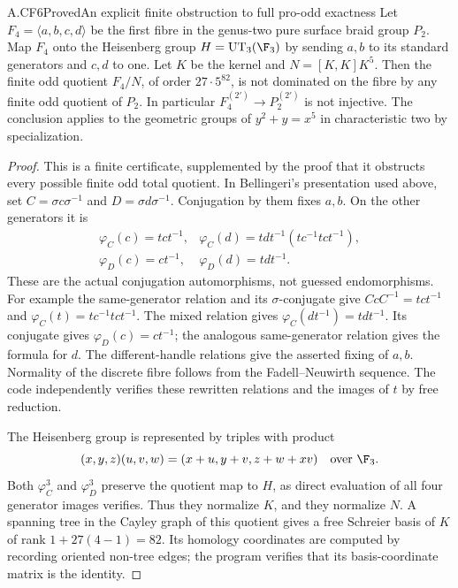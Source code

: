 \begin{claim}{A.CF6}{Proved}{An explicit finite obstruction to full pro-odd exactness}
Let $F_4=\langle a,b,c,d\rangle$ be the first fibre in the genus-two
pure surface braid group $P_2$. Map $F_4$ onto the Heisenberg group
$H=\operatorname{UT}_3(\F_3)$ by sending $a,b$ to its standard
generators and $c,d$ to one. Let $K$ be the kernel and
$N=[K,K]K^5$. Then the finite odd quotient $F_4/N$, of order
$27\cdot5^{82}$, is not dominated on the fibre by any finite odd
quotient of $P_2$. In particular $F_4^{(2')}\to P_2^{(2')}$ is not
injective. The conclusion applies to the geometric groups of
$y^2+y=x^5$ in characteristic two by specialization.
\end{claim}
\begin{proof}
This is a finite certificate, supplemented by the proof that it
obstructs every possible finite odd total quotient. In Bellingeri's
presentation used above, set
$C=\sigma c\sigma^{-1}$ and $D=\sigma d\sigma^{-1}$.
Conjugation by them fixes $a,b$. On the other generators it is
\[
 \begin{array}{ll}
 \varphi_C(c)=tct^{-1},&
 \varphi_C(d)=tdt^{-1}(tc^{-1}tct^{-1}),\\
 \varphi_D(c)=ct^{-1},&
 \varphi_D(d)=tdt^{-1}.
 \end{array}                                                    \tag{CF.1}
\]
These are the actual conjugation automorphisms, not guessed
endomorphisms. For example the same-generator relation and its
$\sigma$-conjugate give
$CcC^{-1}=tct^{-1}$ and
$\varphi_C(t)=tc^{-1}tct^{-1}$. The mixed relation gives
$\varphi_C(dt^{-1})=tdt^{-1}$. Its conjugate gives
$\varphi_D(c)=ct^{-1}$; the analogous same-generator relation gives
the formula for $d$. The different-handle relations give the asserted
fixing of $a,b$. Normality of the discrete fibre follows from the
Fadell--Neuwirth sequence. The code independently verifies these
rewritten relations and the images of $t$ by free reduction.

The Heisenberg group is represented by triples with product
\[
 (x,y,z)(u,v,w)=(x+u,y+v,z+w+xv)\quad\text{over }\F_3.
\]
Both $\varphi_C^3$ and $\varphi_D^3$ preserve the quotient map to
$H$, as direct evaluation of all four generator images verifies.
Thus they normalize $K$, and they normalize $N$. A spanning tree in
the Cayley graph of this quotient gives a free Schreier basis of $K$
of rank $1+27(4-1)=82$. Its homology coordinates are computed by
recording oriented non-tree edges; the program verifies that its
basis-coordinate matrix is the identity.


\end{proof}
